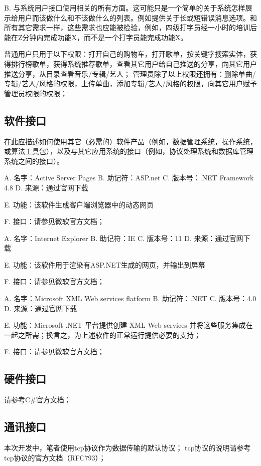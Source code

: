 B. 与系统用户接口使用相关的所有方面。这可能只是一个简单的关于系统怎样展示给用户而该做什么和不该做什么的列表。例如提供关于长或短错误消息选项。和所有其它需求一样，这些需求也应能被检验，例如，四级打字员经一小时的培训后能在Z分钟内完成功能X，而不是一个打字员能完成功能X。

普通用户只用于以下权限：打开自己的购物车，打开歌单，按关键字搜索实体，获得排行榜歌单，获得系统推荐歌单，查看其它用户给自己推送的分享，向其它用户推送分享，从目录查看音乐/专辑/艺人；
管理员除了以上权限还拥有：删除单曲/专辑/艺人/风格的权限，上传单曲，添加专辑/艺人/风格的权限，向其它用户赋予管理员权限的权限；
\subsection{软件接口}


在此应描述如何使用其它（必需的）软件产品（例如，数据管理系统，操作系统，或算法工具包），以及与其它应用系统的接口（例如，协议处理系统和数据库管理系统之间的接口）。



A.	名字：Active Server Pages
B.	助记符：ASP.net
C.  版本号：.NET Framework 4.8
D.	来源：通过官网下载

E. 功能：该软件生成客户端浏览器中的动态网页

F. 接口：请参见微软官方文档；

A.	名字：Internet Explorer
B.	助记符：IE
C.  版本号：11
D.	来源：通过官网下载

E. 功能：该软件用于渲染有ASP.NET生成的网页，并输出到屏幕

F. 接口：请参见微软官方文档；

A.	名字：Microsoft XML Web services flatform
B.	助记符：.NET
C.  版本号：4.0
D.	来源：通过官网下载

E. 功能：Microsoft .NET 平台提供创建 XML Web services 并将这些服务集成在一起之所需；换言之，为上述软件的正常运行提供必要的支持；

F. 接口：请参见微软官方文档；

\subsection{硬件接口}
请参考C\#官方文档；



\subsection{通讯接口}
本次开发中，笔者使用tcp协议作为数据传输的默认协议；
tcp协议的说明请参考tcp协议的官方文档（RFC793）；
